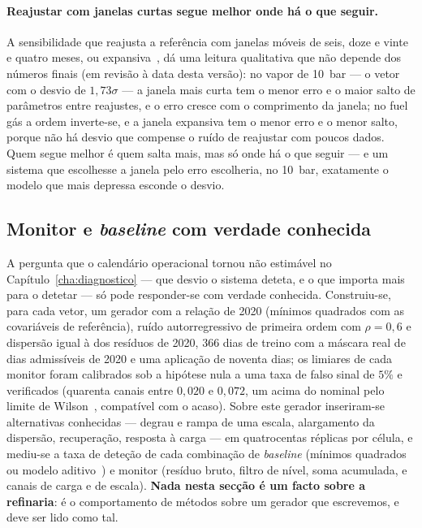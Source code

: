 \paragraph{Reajustar com janelas curtas segue melhor onde há o que seguir.}
A sensibilidade que reajusta a referência com janelas móveis de seis, doze e
vinte e quatro meses, ou expansiva~\cite{PesaranTimmermann2007}, dá uma
leitura qualitativa que não
depende dos números finais (em revisão à data desta versão): no vapor de
10~bar --- o vetor com o desvio de $1{,}73\sigma$ --- a janela mais curta
tem o menor erro e o maior salto de parâmetros entre reajustes, e o erro
cresce com o comprimento da janela; no fuel gás a ordem inverte-se, e a
janela expansiva tem o menor erro e o menor salto, porque não há desvio que
compense o ruído de reajustar com poucos dados. Quem segue melhor é quem
salta mais, mas só onde há o que seguir --- e um sistema que escolhesse a
janela pelo erro escolheria, no 10~bar, exatamente o modelo que mais depressa
esconde o desvio.

\subsection{Monitor e \emph{baseline} com verdade conhecida}
\label{sec:verdade-conhecida}

A pergunta que o calendário operacional tornou não estimável no
Capítulo~\ref{cha:diagnostico} --- que desvio o sistema deteta, e o que
importa mais para o detetar --- só pode responder-se com verdade conhecida.
Construiu-se, para cada vetor, um gerador com a relação de 2020 (mínimos
quadrados com as covariáveis de referência), ruído autorregressivo de
primeira ordem com $\rho = 0{,}6$ e dispersão igual à dos resíduos de 2020,
366 dias de treino com a máscara real de dias admissíveis de 2020 e uma
aplicação de noventa dias; os limiares de cada monitor foram calibrados sob
a hipótese nula a uma taxa de falso sinal de $5\%$ e verificados (quarenta
canais entre $0{,}020$ e $0{,}072$, um acima do nominal pelo limite de
Wilson~\cite{Wilson1927}, compatível com o acaso). Sobre este gerador inseriram-se
alternativas conhecidas --- degrau e rampa de uma escala, alargamento da
dispersão, recuperação, resposta à carga --- em quatrocentas réplicas por
célula, e mediu-se a taxa de deteção de cada combinação de \emph{baseline}
(mínimos quadrados ou modelo aditivo~\cite{HastieTibshirani1986,Wood2017}) e
monitor (resíduo bruto, filtro de
nível, soma acumulada, e canais de carga e de escala). \textbf{Nada nesta
secção é um facto sobre a refinaria}: é o comportamento de métodos sobre um
gerador que escrevemos, e deve ser lido como tal.

